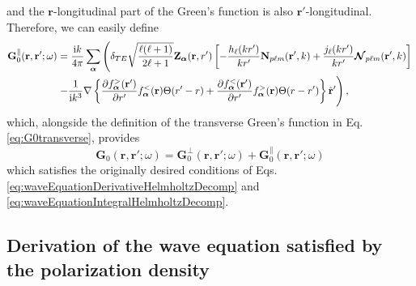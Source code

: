 \documentclass{article}
\begin{document}
and the $\mathbf{r}$-longitudinal part of the Green's function is also $\mathbf{r}'$-longitudinal. Therefore, we can easily define
\begin{equation}\label{eq:G0longitudinal}
\begin{split}
\mathbf{G}_0^\parallel(\mathbf{r},\mathbf{r}';\omega) &= \frac{\mathrm{i}k}{4\pi}\sum_{\bm{\alpha}}\left(\delta_{TE}\sqrt{\frac{\ell(\ell + 1)}{2\ell + 1}}\mathbf{Z}_{\bm{\alpha}}(\mathbf{r},r')\left[-\frac{h_\ell(kr')}{kr'}\mathbf{N}_{p\ell m}(\mathbf{r}',k) + \frac{j_\ell(kr')}{kr'}\bm{\mathcal{N}}_{p\ell m}(\mathbf{r}',k)\right]\right.\\
&\left. -\frac{1}{\mathrm{i} k^3}\nabla\left\{\frac{\partial f_{\bm{\alpha}}^>(\mathbf{r}')}{\partial r'}f_{\bm{\alpha}}^<(\mathbf{r})\Theta(r' - r) + \frac{\partial f_{\bm{\alpha}}^<(\mathbf{r}')}{\partial r'}f_{\bm{\alpha}}^>(\mathbf{r})\Theta(r - r')\right\}\hat{\mathbf{r}}' \vphantom{\sqrt{\frac{\ell(\ell + 1)}{2\ell + 1}}} \right),
\end{split}
\end{equation}
which, alongside the definition of the transverse Green's function in Eq. \eqref{eq:G0transverse}, provides
\begin{equation}
\mathbf{G}_0(\mathbf{r},\mathbf{r}';\omega) = \mathbf{G}_0^\perp(\mathbf{r},\mathbf{r}';\omega) + \mathbf{G}_0^\parallel(\mathbf{r},\mathbf{r}';\omega)
\end{equation}
which satisfies the originally desired conditions of Eqs. \eqref{eq:waveEquationDerivativeHelmholtzDecomp} and \eqref{eq:waveEquationIntegralHelmholtzDecomp}.










\subsection{Derivation of the wave equation satisfied by the polarization density}\label{sec:polarizationWaveEquation}
\end{document}
